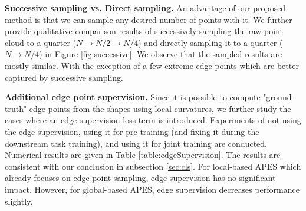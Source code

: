 \documentclass[10pt,twocolumn,letterpaper]{article}
\begin{document}
\textbf{Successive sampling vs. Direct sampling.}
An advantage of our proposed method is that we can sample any desired number of points with it.
We further provide qualitative comparison results of successively sampling the raw point cloud to a quarter ($N\rightarrow N/2 \rightarrow N/4$) and directly sampling it to a quarter ($N\rightarrow N/4$) in Figure \ref{fig:successive}. We observe that the sampled results are mostly similar. With the exception of a few extreme edge points which are better captured by successive sampling.

\textbf{Additional edge point supervision.} Since it is possible to compute "ground-truth" edge points from the shapes using local curvatures, we further study the cases where an edge supervision loss term is introduced. Experiments of not using the edge supervision, using it for pre-training (and fixing it during the downstream task training), and using it for joint training are conducted.
Numerical results are given in Table \ref{table:edgeSupervision}. The results are consistent with our conclusion in subsection \ref{sec:cls}. For local-based APES which already focuses on edge point sampling, edge supervision has no significant impact. However, for global-based APES, edge supervision decreases performance slightly.


\begin{table*}[t]
\centering
{}
\caption{Comparison with other sampling methods. Evaluated on the ModelNet40 classification benchmark with multiple sampling sizes. 
\vspace{-0.1cm}
}
\label{table:compare}
\end{table*}
\end{document}
